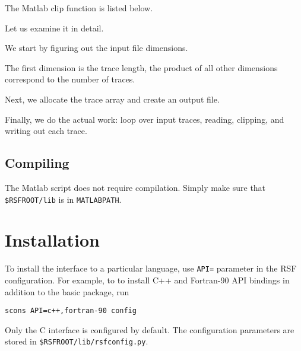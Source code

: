 \lstset{language=matlab}

The Matlab clip function is listed below.



Let us examine it in detail. 


We start by figuring out the input file dimensions.


The first dimension is the trace length, the product of all other
dimensions correspond to the number of traces.


Next, we allocate the trace array and create an output file.


Finally, we do the actual work: loop over input traces, reading,
clipping, and writing out each trace.

\subsection{Compiling}

The Matlab script does not require compilation. Simply make sure that
\texttt{\$RSFROOT/lib} is in \texttt{MATLABPATH}.

\section{Installation} 

To install the interface to a particular language, use \texttt{API=}
parameter in the RSF configuration. For example, to to install C++ and
Fortran-90 API bindings in addition to the basic package, run
\begin{verbatim}
scons API=c++,fortran-90 config
\end{verbatim}
Only the C interface is configured by default. The configuration
parameters are stored in \texttt{\$RSFROOT/lib/rsfconfig.py}.

 



